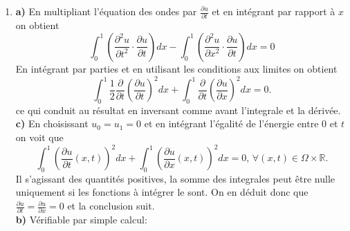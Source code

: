 \documentclass[12pt,a4paper]{article}
\begin{document}
\begin{enumerate}
{\bf b)} En multipliant l'\'equation de la
chaleur par $u$ et
en int\'egrant par rapport \`a $x$, on obient:
$$
\int_0^1 \left(\frac{\partial u}{\partial t}\cdot u \right)dx- \int_0^1
\left(\frac{\partial^2 u}{\partial x^2}\cdot u \right)dx = 0
$$
En int\'egrant ensuite par parties et en utilisant les conditions aux
limites $u(0,t)=u(1,t)=0$ on obtient
$$
\int_0^1 \frac{1}{2}\frac{\partial}{\partial t} \left(u^2(x,t)\right) dx+\int_0^1
\left(\frac{\partial u}{\partial x}\right)^2dx=0.
$$
La fonction $u$ \'etant suppos\'ee suffisamment r\'eguli\`ere on peut
inverser l'integrale par rapport \`a $x$ et la d\'eriv\'ee par rapport
\`a $t$. En rempla\c{c}ant l'expression de $E(t)$ on obtient le r\'esultat.\\
{\bf c)} 
En appliquant l'in\'egalit\'e de Poincar\'e \`a $v(x)= u(x,t)$, l'\'egalit\'e de l'\'energie du point pr\'ec\'edent se
re-transcrit comme
$$
\frac{dE(t)}{dt} = -\int_0^1
\left(\frac{\partial u}{\partial x}\right)^2dx \le -2\int_0^1 u^2(x,t)dx =  -2E(t).
$$
En divisant par $E(t)$ (qui est une quantit\'e positive) et
int\'egrant entre $0$ et $t$, on obtient le r\'esultat. On voit bien que l'\'energie {\it d\'ecro\^it exponentiellement en temps}.
\item 
{\bf a)} En multipliant l'\'equation des ondes par $\frac{\partial u}{\partial t}$ et
en int\'egrant par rapport \`a $x$ on obtient
$$
\int_0^1 \left(\frac{\partial^2 u}{\partial t^2}\cdot \frac{\partial
    u}{\partial t} \right)dx- \int_0^1\left(
\frac{\partial^2 u}{\partial x^2}\cdot \frac{\partial
    u}{\partial t} \right)dx = 0
$$
En int\'egrant par parties et en utilisant les conditions aux
limites on obtient
$$
\int_0^1 \frac{1}{2}\frac{\partial}{\partial t} \left(\frac{\partial
    u}{\partial t}\right)^2 dx+\int_0^1 \frac{\partial}{\partial t}
\left(\frac{\partial u}{\partial x}\right)^2dx=0.
$$
ce qui conduit au r\'esultat en inversant comme avant l'integrale et la d\'eriv\'ee.\\
{\bf c)} En choisissant $u_0=u_1=0$ et en int\'egrant l'\'egalit\'e de
l'\'energie entre $0$ et $t$ on voit que
$$
\int_0^1 \left(\frac{\partial u}{\partial
      t}(x,t)\right)^2dx + \int_0^1 \left(\frac{\partial u}{\partial
      x}(x,t)\right)^2dx = 0,\, \forall (x,t) \in \Omega\times\mathbb{R}.
$$
Il s'agissant des quantit\'es positives, la somme des integrales peut \^etre
nulle uniquement si les fonctions \`a int\'egrer le sont. On en
d\'eduit donc que $\frac{\partial u}{\partial t}= \frac{\partial
  u}{\partial x} = 0$ et la conclusion suit.\\
{\bf b)} V\'erifiable par simple calcul:

\end{enumerate}
\end{document}
